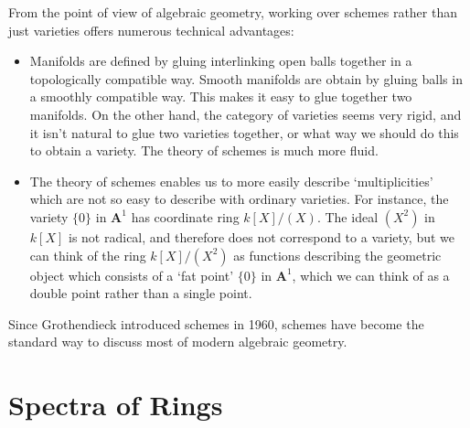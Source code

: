 From the point of view of algebraic geometry, working over schemes rather than just varieties offers numerous technical advantages:
%
\begin{itemize}
    \item Manifolds are defined by gluing interlinking open balls together in a topologically compatible way. Smooth manifolds are obtain by gluing balls in a smoothly compatible way. This makes it easy to glue together two manifolds. On the other hand, the category of varieties seems very rigid, and it isn't natural to glue two varieties together, or what way we should do this to obtain a variety. The theory of schemes is much more fluid.

    \item The theory of schemes enables us to more easily describe `multiplicities' which are not so easy to describe with ordinary varieties. For instance, the variety $\{ 0 \}$ in $\mathbf{A}^1$ has coordinate ring $k[X]/(X)$. The ideal $(X^2)$ in $k[X]$ is not radical, and therefore does not correspond to a variety, but we can think of the ring $k[X]/(X^2)$ as functions describing the geometric object which consists of a `fat point' $\{ 0 \}$ in $\mathbf{A}^1$, which we can think of as a double point rather than a single point.
\end{itemize}
%
Since Grothendieck introduced schemes in 1960, schemes have become the standard way to discuss most of modern algebraic geometry.

\section{Spectra of Rings}

